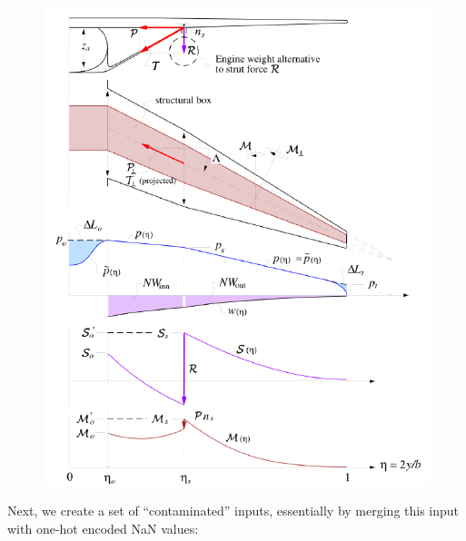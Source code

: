 \begin{figure}[H]
    \centering
    \includegraphics[page=2, width=5in]{../figures/nan-propagation/cropped.pdf}
\end{figure}

Next, we create a set of ``contaminated'' inputs, essentially by merging this input with one-hot encoded NaN values:

